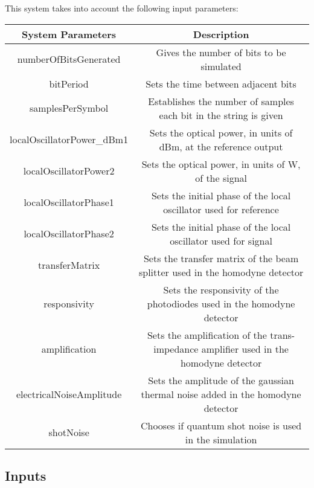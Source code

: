 This system takes into account the following input parameters:
\begin{table}[H]
\centering
\begin{tabulary}{1.0\textwidth}{|C|C|}
\hline
\textbf{System Parameters} & \textbf{Description}                                                                   \\ \hline
numberOfBitsGenerated      & Gives the number of bits to be simulated                                               \\ \hline
bitPeriod                  & Sets the time between adjacent bits                                                    \\ \hline
samplesPerSymbol           & Establishes the number of samples each bit in the string is given                      \\ \hline
localOscillatorPower\_dBm1 & Sets the optical power, in units of dBm, at the reference output	                      \\ \hline
localOscillatorPower2      & Sets the optical power, in units of W, of the signal                                   \\ \hline
localOscillatorPhase1      & Sets the initial phase of the local oscillator used for reference                      \\ \hline
localOscillatorPhase2      & Sets the initial phase of the local oscillator used for signal                         \\ \hline
transferMatrix             & Sets the transfer matrix of the beam splitter used in the homodyne detector            \\ \hline
responsivity               & Sets the responsivity of the photodiodes used in the homodyne detector                 \\ \hline
amplification              & Sets the amplification of the trans-impedance amplifier used in the homodyne detector  \\ \hline
electricalNoiseAmplitude   & Sets the amplitude of the gaussian thermal noise added in the homodyne detector        \\ \hline
shotNoise                  & Chooses if quantum shot noise is used in the simulation                                \\ \hline
\end{tabulary}
\end{table}		

\subsection*{Inputs}

